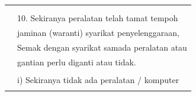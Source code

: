 \documentclass[
]{article}
\begin{document}
\begin{longtable}[]{@{}ll@{}}
\begin{minipage}[t]{0.71\columnwidth}
\end{minipage}\tabularnewline
\begin{minipage}[t]{0.23\columnwidth}\raggedright
\strut
\end{minipage} & \begin{minipage}[t]{0.71\columnwidth}\raggedright
\strut
\end{minipage}\tabularnewline
\begin{minipage}[t]{0.23\columnwidth}\raggedright
\strut
\end{minipage} & \begin{minipage}[t]{0.71\columnwidth}\raggedright
10. Sekiranya peralatan telah tamat tempoh\strut
\end{minipage}\tabularnewline
\begin{minipage}[t]{0.23\columnwidth}\raggedright
\strut
\end{minipage} & \begin{minipage}[t]{0.71\columnwidth}\raggedright
jaminan (waranti) syarikat penyelenggaraan,\strut
\end{minipage}\tabularnewline
\begin{minipage}[t]{0.23\columnwidth}\raggedright
\strut
\end{minipage} & \begin{minipage}[t]{0.71\columnwidth}\raggedright
Semak dengan syarikat samada peralatan atau\strut
\end{minipage}\tabularnewline
\begin{minipage}[t]{0.23\columnwidth}\raggedright
\strut
\end{minipage} & \begin{minipage}[t]{0.71\columnwidth}\raggedright
gantian perlu diganti atau tidak.\strut
\end{minipage}\tabularnewline
\begin{minipage}[t]{0.23\columnwidth}\raggedright
\strut
\end{minipage} & \begin{minipage}[t]{0.71\columnwidth}\raggedright
\strut
\end{minipage}\tabularnewline
\begin{minipage}[t]{0.23\columnwidth}\raggedright
\strut
\end{minipage} & \begin{minipage}[t]{0.71\columnwidth}\raggedright
i) Sekiranya tidak ada peralatan / komputer\strut
\end{minipage}\tabularnewline
\begin{minipage}[t]{0.23\columnwidth}\raggedright

\end{minipage}
\end{longtable}
\end{document}
